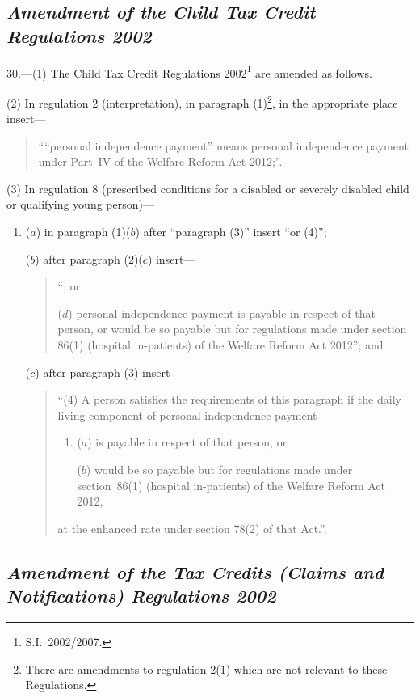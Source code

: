 \documentclass[12pt,a4paper]{article}
\begin{document}
\subsection*{\itshape Amendment of the Child Tax Credit Regulations 2002}

30.—(1) The Child Tax Credit Regulations 2002\footnote{S.I.~2002/2007.} are amended as follows.

(2) In regulation 2 (interpretation), in paragraph (1)\footnote{There are amendments to regulation 2(1) which are not relevant to these Regulations.}, in the appropriate place insert—
\begin{quotation}
““personal independence payment” means personal independence payment under Part~IV of the Welfare Reform Act 2012;”.
\end{quotation}

(3) In regulation 8 (prescribed conditions for a disabled or severely disabled child or qualifying young person)—
\begin{enumerate}\item[]
($a$) in paragraph (1)($b$)  after “paragraph (3)” insert “or (4)”;

($b$) after paragraph (2)($c$)  insert—
\begin{quotation}
“; or

($d$) personal independence payment is payable in respect of that person, or would be so payable but for regulations made under section 86(1) (hospital in-patients) of the Welfare Reform Act 2012”; and
\end{quotation}

($c$) after paragraph (3) insert—
\begin{quotation}
“(4) A person satisfies the requirements of this paragraph if the daily living component of personal independence payment—
\begin{enumerate}\item[]
($a$) is payable in respect of that person, or

($b$) would be so payable but for regulations made under section~86(1) (hospital in-patients) of the Welfare Reform Act 2012,
\end{enumerate}
at the enhanced rate under section 78(2) of that Act.”.
\end{quotation}
\end{enumerate}

\subsection*{\itshape Amendment of the Tax Credits (Claims and Notifications) Regulations 2002}
\end{document}
